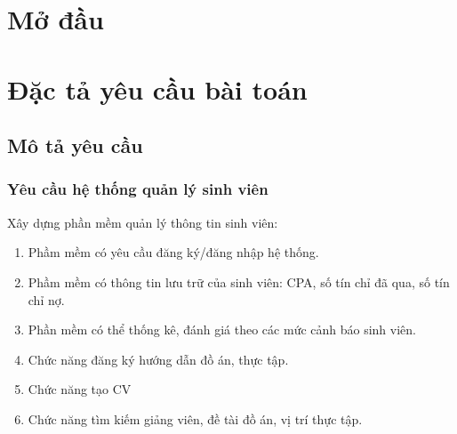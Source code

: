 


\begin{titlepage}
	
	
	
	\newpage
	\tableofcontents
\end{titlepage}
\newpage
\setcounter{page}{1}
\rfoot{\thepage}

\chapter*{Mở đầu}








\chapter{Đặc tả yêu cầu bài toán}
\section{Mô tả yêu cầu}
\subsection{Yêu cầu hệ thống quản lý sinh viên}
Xây dựng phần mềm quản lý thông tin sinh viên:
\begin{enumerate}
	\item Phầm mềm có yêu cầu đăng ký/đăng nhập hệ thống.
	\item Phầm mềm có thông tin lưu trữ của sinh viên: CPA, số tín chỉ đã qua, số tín chỉ nợ.
	\item Phần mềm có thể thống kê, đánh giá theo các mức cảnh báo sinh viên.
	\item Chức năng đăng ký hướng dẫn đồ án, thực tập.
	\item Chức năng tạo CV
	\item Chức năng tìm kiếm giảng viên, đề tài đồ án, vị trí thực tập.
\end{enumerate}

